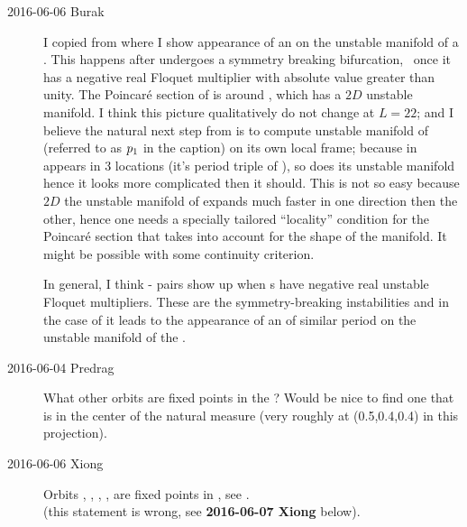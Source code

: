 \begin{description}
\item[2016-06-06 Burak] I copied  from
 where I show appearance of an \RPO{}
on the unstable manifold of a . This happens after 
undergoes a symmetry breaking bifurcation, \ie\  once it has a negative
real Floquet multiplier with absolute value greater than unity. The
Poincar\'e section of  is around ,
which has a $2D$ unstable manifold. I think this picture qualitatively
do not change at $L=22$; and I believe the natural next step from
 is to compute unstable manifold of 
(referred to as $p_1$ in the caption) on its own local frame;
because in   appears in 3 locations
(it's period triple of ), so does its unstable manifold hence it
looks more complicated then it should. This is not so easy because
$2D$ the unstable manifold of  expands much faster in one
direction then the other, hence one needs a specially tailored
``locality'' condition for the Poincar\'e section that takes into
account for the shape of the manifold. It might be possible with some
continuity criterion.

In general, I think \PPO{} - \RPO{} pairs show up when \PPO{}s have
negative real unstable Floquet multipliers. These are the
symmetry-breaking instabilities and in the case of
 it leads to the appearance of an \RPO{} of
similar period on the unstable manifold of the \PPO{}.

\item[2016-06-04 Predrag]
What other orbits are fixed points in the \PoincSec? Would be nice to
find one that is in the center of the natural measure (very roughly at
(0.5,0.4,0.4) in this projection).

\item[2016-06-06 Xiong]
Orbits , , , ,  are fixed points
in \PoincSec, see  .
\\
(this statement is wrong, see {\bf 2016-06-07 Xiong} below).


\end{description}
